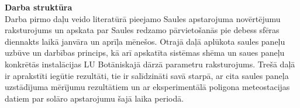 \textbf{Darba struktūra}\\
Darba pirmo daļu veido literatūrā pieejamo Saules apstarojuma novērtējumu raksturojums un apskata par Saules redzamo pārvietošanās pie debess sfēras diennakts laikā janvāra un aprīļa mēnešos. Otrajā daļā aplūkota saules paneļu uzbūve un darbības princips, kā arī apskatīta sistēmas shēma un saues paneļu konkrētās instalācijas LU Botāniskajā dārzā parametru raksturojums.
Trešā daļā ir aprakstīti iegūtie rezultāti, tie ir salīdzināti savā starpā, ar cita saules paneļa uzstādījuma mērījumu rezultātiem un ar eksperimentālā poligona meteostacijas datiem par solāro apstarojumu šajā laika periodā.




